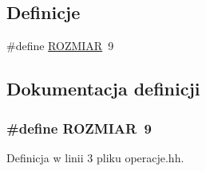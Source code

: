 \subsection*{\-Definicje}
\begin{DoxyCompactItemize}
\item 
\#define \hyperlink{operacje_8hh_aa50aa866c5823769bb02e986d29a0589}{\-R\-O\-Z\-M\-I\-A\-R}~9
\end{DoxyCompactItemize}


\subsection{\-Dokumentacja definicji}
\hypertarget{operacje_8hh_aa50aa866c5823769bb02e986d29a0589}{
\subsubsection[{\-R\-O\-Z\-M\-I\-A\-R}]{\setlength{\rightskip}{0pt plus 5cm}\#define {\bf \-R\-O\-Z\-M\-I\-A\-R}~9}}\label{operacje_8hh_aa50aa866c5823769bb02e986d29a0589}


\-Definicja w linii 3 pliku operacje.\-hh.

